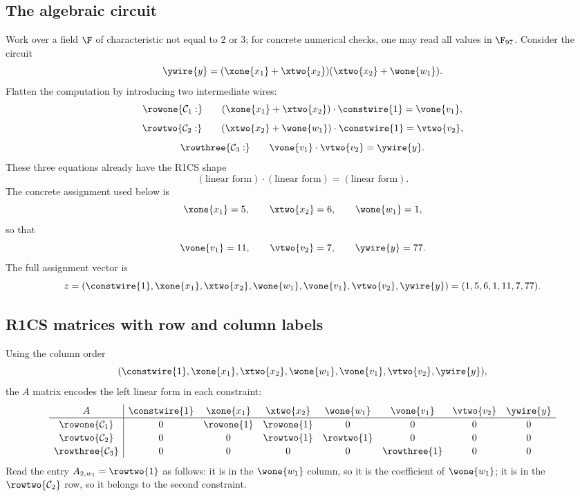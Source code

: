 \subsection{The algebraic circuit}

Work over a field $\F$ of characteristic not equal to $2$ or $3$; for concrete numerical checks, one may read all values in $\F_{97}$. Consider the circuit
\[
    \ywire{y}=(\xone{x_1}+\xtwo{x_2})(\xtwo{x_2}+\wone{w_1}).
\]
Flatten the computation by introducing two intermediate wires:
\[
    \rowone{\mathcal C_1:}\qquad
    (\xone{x_1}+\xtwo{x_2})\cdot \constwire{1}=\vone{v_1},
\]
\[
    \rowtwo{\mathcal C_2:}\qquad
    (\xtwo{x_2}+\wone{w_1})\cdot \constwire{1}=\vtwo{v_2},
\]
\[
    \rowthree{\mathcal C_3:}\qquad
    \vone{v_1}\cdot\vtwo{v_2}=\ywire{y}.
\]
These three equations already have the R1CS shape
\[
    (\text{linear form})\cdot(\text{linear form})=(\text{linear form}).
\]
The concrete assignment used below is
\[
    \xone{x_1}=5,
    \qquad
    \xtwo{x_2}=6,
    \qquad
    \wone{w_1}=1,
\]
so that
\[
    \vone{v_1}=11,
    \qquad
    \vtwo{v_2}=7,
    \qquad
    \ywire{y}=77.
\]
The full assignment vector is
\[
    z=(\constwire{1},\xone{x_1},\xtwo{x_2},\wone{w_1},\vone{v_1},\vtwo{v_2},\ywire{y})
      =(1,5,6,1,11,7,77).
\]

\subsection{R1CS matrices with row and column labels}

Using the column order
\[
    (\constwire{1},\xone{x_1},\xtwo{x_2},\wone{w_1},\vone{v_1},\vtwo{v_2},\ywire{y}),
\]
the $A$ matrix encodes the left linear form in each constraint:
\[
\renewcommand{\arraystretch}{1.15}
\begin{array}{c|ccccccc}
A & \constwire{1} & \xone{x_1} & \xtwo{x_2} & \wone{w_1} & \vone{v_1} & \vtwo{v_2} & \ywire{y} \\
\hline
\rowone{\mathcal C_1} & 0 & \rowone{1} & \rowone{1} & 0 & 0 & 0 & 0 \\
\rowtwo{\mathcal C_2} & 0 & 0 & \rowtwo{1} & \rowtwo{1} & 0 & 0 & 0 \\
\rowthree{\mathcal C_3} & 0 & 0 & 0 & 0 & \rowthree{1} & 0 & 0
\end{array}
\]
Read the entry $A_{2,w_1}=\rowtwo{1}$ as follows: it is in the $\wone{w_1}$ column, so it is the coefficient of $\wone{w_1}$; it is in the $\rowtwo{\mathcal C_2}$ row, so it belongs to the second constraint.

